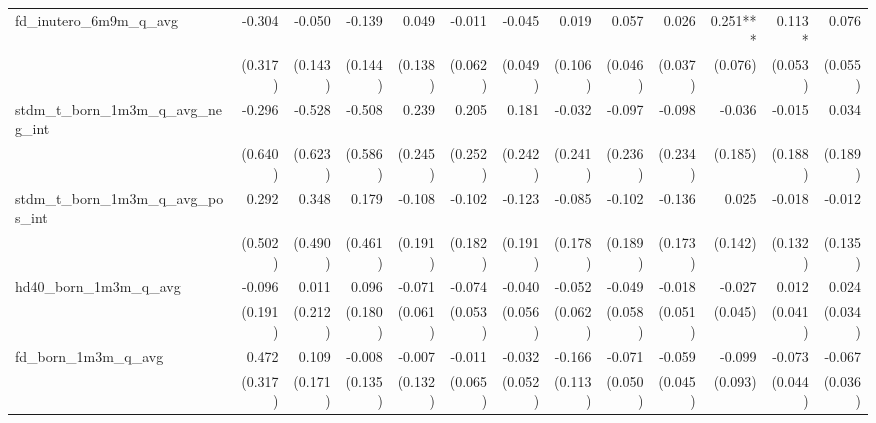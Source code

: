 \begin{tabular}{lrrrrrrrrrrrr}
fd\_inutero\_6m9m\_q\_avg                   &       -0.304 &       -0.050 &       -0.139 &        0.049 &       -0.011 &       -0.045 &        0.019 &        0.057 &        0.026 &     0.251*** &       0.113* &        0.076 \\ 
                                            &      (0.317) &      (0.143) &      (0.144) &      (0.138) &      (0.062) &      (0.049) &      (0.106) &      (0.046) &      (0.037) &      (0.076) &      (0.053) &      (0.055) \\ 
stdm\_t\_born\_1m3m\_q\_avg\_neg\_int       &       -0.296 &       -0.528 &       -0.508 &        0.239 &        0.205 &        0.181 &       -0.032 &       -0.097 &       -0.098 &       -0.036 &       -0.015 &        0.034 \\ 
                                            &      (0.640) &      (0.623) &      (0.586) &      (0.245) &      (0.252) &      (0.242) &      (0.241) &      (0.236) &      (0.234) &      (0.185) &      (0.188) &      (0.189) \\ 
stdm\_t\_born\_1m3m\_q\_avg\_pos\_int       &        0.292 &        0.348 &        0.179 &       -0.108 &       -0.102 &       -0.123 &       -0.085 &       -0.102 &       -0.136 &        0.025 &       -0.018 &       -0.012 \\ 
                                            &      (0.502) &      (0.490) &      (0.461) &      (0.191) &      (0.182) &      (0.191) &      (0.178) &      (0.189) &      (0.173) &      (0.142) &      (0.132) &      (0.135) \\ 
hd40\_born\_1m3m\_q\_avg                    &       -0.096 &        0.011 &        0.096 &       -0.071 &       -0.074 &       -0.040 &       -0.052 &       -0.049 &       -0.018 &       -0.027 &        0.012 &        0.024 \\ 
                                            &      (0.191) &      (0.212) &      (0.180) &      (0.061) &      (0.053) &      (0.056) &      (0.062) &      (0.058) &      (0.051) &      (0.045) &      (0.041) &      (0.034) \\ 
fd\_born\_1m3m\_q\_avg                      &        0.472 &        0.109 &       -0.008 &       -0.007 &       -0.011 &       -0.032 &       -0.166 &       -0.071 &       -0.059 &       -0.099 &       -0.073 &       -0.067 \\ 
                                            &      (0.317) &      (0.171) &      (0.135) &      (0.132) &      (0.065) &      (0.052) &      (0.113) &      (0.050) &      (0.045) &      (0.093) &      (0.044) &      (0.036) \\ 

\end{tabular}
